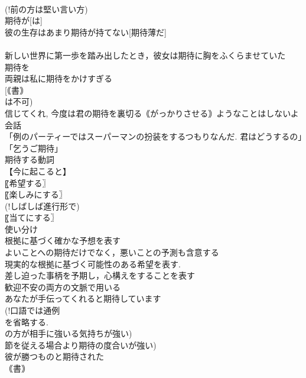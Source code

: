 \documentclass[8pt]{extreport}
\begin{document}
\begin{CJK}{UTF8}{min}
\\	(!前の方は堅い言い方)
\\	期待が[は]
\\	彼の生存はあまり期待が持てない[期待薄だ]
\\	[｟米｠ 
\\	私の期待ははずれた
\\	そのことを知ると息子に対する期待が高まった
\\	期待に
\\	彼は我々の期待にこたえてくれた
\\	私の期待に反して彼は失敗した
\\	私たちは期待にわくわくした[胸を躍らせた]
\\	新しい世界に第一歩を踏み出したとき，彼女は期待に胸をふくらませていた
\\	期待を
\\	両親は私に期待をかけすぎる
\\	[｟書｠ 
\\	は不可)
\\	信じてくれ, 今度は君の期待を裏切る｟がっかりさせる｠ようなことはしないよ
\\	会話
\\	「例のパーティーではスーパーマンの扮装をするつもりなんだ. 君はどうするの」「乞うご期待」
\\	期待する動詞
\\	【今に起こると】
\\	〖希望する〗
\\	〖楽しみにする〗
\\	(!しばしば進行形で) 
\\	〖当てにする〗
\\	使い分け
\\	根拠に基づく確かな予想を表す
\\	よいことへの期待だけでなく，悪いことの予測も含意する
\\	現実的な根拠に基づく可能性のある希望を表す.
\\	差し迫った事柄を予期し，心構えをすることを表す
\\	歓迎不安の両方の文脈で用いる
\\	あなたが手伝ってくれると期待しています
\\	(!口語では通例 
\\	を省略する. 
\\	の方が相手に強いる気持ちが強い) 
\\	節を従える場合より期待の度合いが強い) 
\\	彼が勝つものと期待された
\\	｟書｠ 

\end{CJK}
\end{document}
